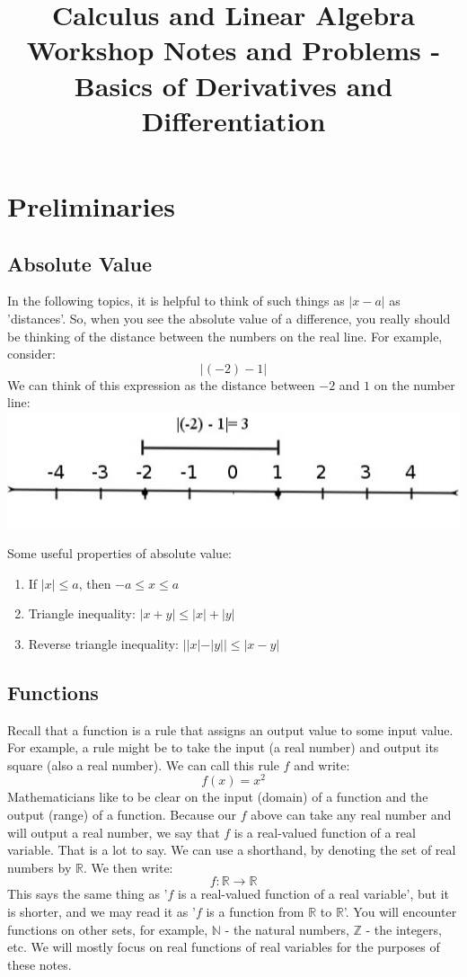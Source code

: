 \documentclass[12pt,a4paper]{article} %
\title{Calculus and Linear Algebra Workshop Notes and Problems - Basics of Derivatives and Differentiation}
\begin{document}
\maketitle
\section{Preliminaries}
\subsection{Absolute Value}
In the following topics, it is helpful to think of such things as $|x -a|$ as 'distances'.  So, when you see the absolute value of a difference, you really should be thinking of the distance between the numbers on the real line.  For example, consider:
$$|(-2) - 1|$$
We can think of this expression as the distance between $-2$ and $1$ on the number line:
\includegraphics[]{dist.jpg}

Some useful properties of absolute value:
\begin{enumerate}
\item If $|x|\leq a$, then $-a\leq x\leq a$
\item Triangle inequality:  $|x +y| \leq |x| +|y|$
\item Reverse triangle inequality: $||x|-|y|| \leq |x-y|$
\end{enumerate}

\subsection{Functions}
Recall that a function is a rule that assigns an output value to some input value.  For example, a rule might be to take the input (a real number) and output its square (also a real number).  We can call this rule $f$ and write:
\begin{equation*}
f(x) = x^2
\end{equation*}
Mathematicians like to be clear on the input (domain) of a function and the output (range) of a function.  Because our $f$ above can take any real number and will output a real number, we say that $f$ is a real-valued function of a real variable.  That is a lot to say.  We can use a shorthand, by denoting the set of real numbers by $\mathbb{R}$.  We then write:
\begin{equation}
f:\mathbb{R}\rightarrow \mathbb{R}
\end{equation}
This says the same thing as '$f$ is a real-valued function of a real variable', but it is shorter, and we may read it as '$f$ is a function from $\mathbb{R}$ to $\mathbb{R}$'.  You will encounter functions on other sets, for example, $\mathbb{N}$ - the natural numbers, $\mathbb{Z}$ - the integers, etc.  We will mostly focus on real functions of real variables for the purposes of these notes. 
\end{document}
